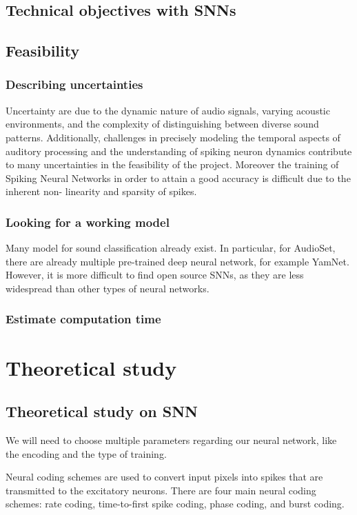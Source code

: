 \documentclass[11pt]{article}
\begin{document}
\subsection{Technical objectives with SNNs}
\subsection{Feasibility}
\subsubsection{Describing uncertainties}
Uncertainty are due to the dynamic nature of audio signals, varying acoustic environments, and the complexity of distinguishing between diverse sound patterns. Additionally, challenges in precisely modeling the temporal aspects of auditory processing and the understanding of spiking neuron dynamics contribute to many uncertainties in the feasibility of the project. Moreover the training of Spiking Neural Networks in order to attain a good accuracy is difficult due to the inherent non- linearity and sparsity of spikes.


\subsubsection{Looking for a working model}

Many model for sound classification already exist. In particular, for AudioSet, there are already multiple pre-trained deep neural network, for example YamNet. However, it is more difficult to find open source SNNs, as they are less widespread than other types of neural networks.


\subsubsection{Estimate computation time}



\section{Theoretical study}
\subsection{Theoretical study on SNN}


We will need to choose multiple parameters regarding our neural network, like the encoding and the type of training.

Neural coding schemes are used to convert input pixels into spikes that are transmitted to the excitatory neurons. There are four main neural coding schemes: rate coding, time-to-first spike coding, phase coding, and burst coding.
\end{document}
